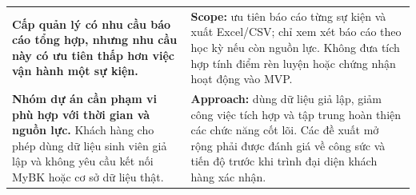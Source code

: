 \begin{longtable}{>{\RaggedRight\arraybackslash}p{}
                  >{\RaggedRight\arraybackslash}p{}}
\rowcolor{lightgray}
\textbf{Cấp quản lý có nhu cầu báo cáo tổng hợp, nhưng nhu cầu này có ưu tiên thấp hơn việc vận hành một sự kiện.} &
\textbf{Scope:} ưu tiên báo cáo từng sự kiện và xuất Excel/CSV; chỉ xem xét báo cáo theo học kỳ nếu còn nguồn lực. Không đưa tích hợp tính điểm rèn luyện hoặc chứng nhận hoạt động vào MVP. \\

\textbf{Nhóm dự án cần phạm vi phù hợp với thời gian và nguồn lực.} Khách hàng cho phép dùng dữ liệu sinh viên giả lập và không yêu cầu kết nối MyBK hoặc cơ sở dữ liệu thật. &
\textbf{Approach:} dùng dữ liệu giả lập, giảm công việc tích hợp và tập trung hoàn thiện các chức năng cốt lõi. Các đề xuất mở rộng phải được đánh giá về công sức và tiến độ trước khi trình đại diện khách hàng xác nhận. \\

\bottomrule
\end{longtable}
\endgroup